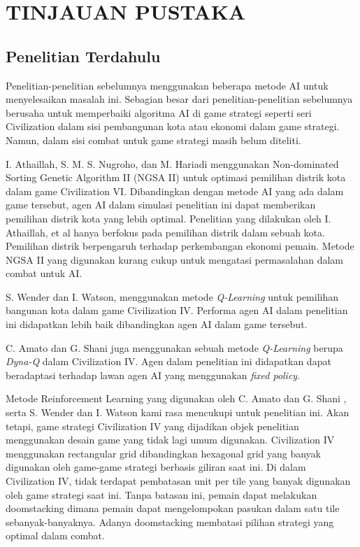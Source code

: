 \chapter{TINJAUAN PUSTAKA}
\label{chap:tinjauanpustaka}


\section{Penelitian Terdahulu}
\label{sec:penelitianterdahulu}

Penelitian-penelitian sebelumnya menggunakan beberapa metode AI untuk menyelesaikan masalah ini. Sebagian besar dari penelitian-penelitian sebelumnya berusaha untuk memperbaiki algoritma AI di game strategi seperti seri Civilization dalam sisi pembangunan kota atau ekonomi dalam game strategi. Namun, dalam sisi combat untuk game strategi masih belum diteliti.

I. Athaillah, S. M. S. Nugroho, dan M. Hariadi menggunakan Non-dominated Sorting Genetic Algorithm II (NGSA II) untuk optimasi pemilihan distrik kota dalam game Civilization VI. Dibandingkan dengan metode AI yang ada dalam game tersebut, agen AI dalam simulasi penelitian ini dapat memberikan pemilihan distrik kota yang lebih optimal. Penelitian yang dilakukan oleh I. Athaillah, et al hanya berfokus pada pemilihan distrik dalam sebuah kota. Pemilihan distrik berpengaruh terhadap perkembangan ekonomi pemain. Metode NGSA II yang digunakan kurang cukup untuk mengatasi permasalahan dalam combat untuk AI. 

S. Wender dan I. Watson, menggunakan metode \emph{Q-Learning} untuk pemilihan bangunan kota dalam game Civilization IV. Performa agen AI dalam penelitian ini didapatkan lebih baik dibandingkan agen AI dalam game tersebut.

C. Amato dan G. Shani juga menggunakan sebuah metode \emph{Q-Learning} berupa \emph{Dyna-Q} dalam Civilization IV. Agen dalam penelitian ini didapatkan dapat beradaptasi terhadap lawan agen AI yang menggunakan \emph{fixed policy}.

Metode Reinforcement Learning yang digunakan oleh C. Amato dan G. Shani \citep{civ4RL}, serta S. Wender dan I. Watson kami rasa mencukupi untuk penelitian ini. Akan tetapi, game strategi Civilization IV yang dijadikan objek penelitian menggunakan desain game yang tidak lagi umum digunakan. Civilization IV menggunakan rectangular grid dibandingkan hexagonal grid yang banyak digunakan oleh game-game strategi berbasis giliran saat ini. Di dalam Civilization IV, tidak terdapat pembatasan unit per tile yang banyak digunakan oleh game strategi saat ini. Tanpa batasan ini, pemain dapat melakukan doomstacking dimana pemain dapat mengelompokan pasukan dalam satu tile sebanyak-banyaknya. Adanya doomstacking membatasi pilihan strategi yang optimal dalam combat.

